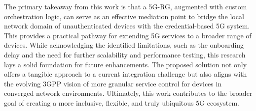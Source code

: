 The primary takeaway from this work is that a \ac{5G-RG}, augmented with custom orchestration logic, can serve as an effective mediation point to bridge the local network domain of unauthenticated devices with the credential-based \ac{5G} system. This provides a practical pathway for extending \ac{5G} services to a broader range of devices. While acknowledging the identified limitations, such as the onboarding delay and the need for further scalability and performance testing, this research lays a solid foundation for future enhancements. The proposed solution not only offers a tangible approach to a current integration challenge but also aligns with the evolving \ac{3GPP} vision of more granular service control for devices in converged network environments. Ultimately, this work contributes to the broader goal of creating a more inclusive, flexible, and truly ubiquitous \ac{5G} ecosystem.
